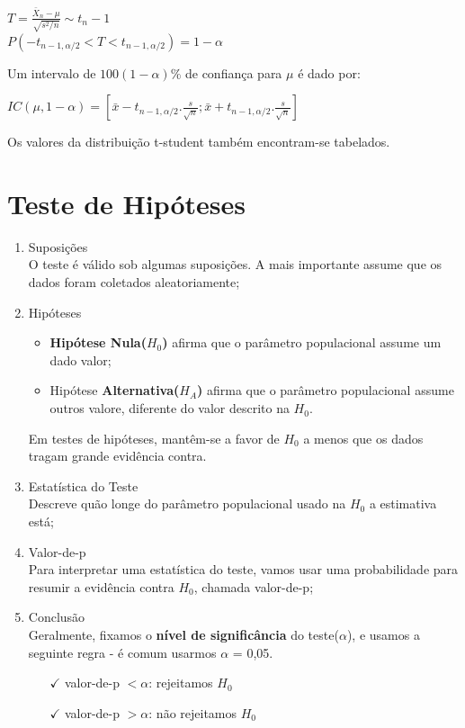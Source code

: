 \documentclass[a4paper, 12pt]{article}
\begin{document}
	\begin{center}
		\Large
		$ 
		T = \frac{\bar{X}_n - \mu}{\sqrt{s^2/n}} \sim t_n-1
		$\\
		$ 
		P(-t_{n-1, \alpha /2}< T < t_{n-1, \alpha /2}) = 1- \alpha
		$
	\end{center}
	Um intervalo de $ 100(1- \alpha) \%$ de confiança para $\mu$ é dado por:
	\begin{center}
		\Large
		$ 
		IC(\mu, 1- \alpha) = [\bar{x} - t_{n-1, \alpha /2}.\frac{s}{\sqrt{n}};\bar{x} + t_{n-1, \alpha /2}.\frac{s}{\sqrt{n}}]
		$
	\end{center}
	Os valores da distribuição t-student também encontram-se tabelados.

\section{Teste de Hipóteses}
	\begin{enumerate}
		\item Suposições\\
		O teste é válido sob algumas suposições. A mais importante assume que os dados foram coletados aleatoriamente;
		
		\item Hipóteses
			\begin{itemize}
				\item \textbf{Hipótese Nula($H_0$)} afirma que o parâmetro populacional assume um dado valor;
				\item Hipótese \textbf{Alternativa($H_A$)} afirma que o parâmetro populacional assume outros valore, diferente do valor descrito na $H_0$.
			\end{itemize}
		Em testes de hipóteses, mantêm-se a favor de $H_0$ a menos que os dados tragam grande evidência contra.
		
		\item Estatística do Teste\\
		Descreve quão longe do parâmetro populacional usado na $H_0$ a estimativa está;
		
		\item Valor-de-p\\
		Para interpretar uma estatística do teste, vamos usar uma probabilidade para resumir a evidência contra $H_0$, chamada valor-de-p;
		
		\item Conclusão\\
		Geralmente, fixamos o \textbf{nível de significância} do teste($\alpha$), e usamos a seguinte regra - é comum usarmos $\alpha$ = 0,05.
			\begin{itemize}
				\item[$\checkmark$] valor-de-p $< \alpha$: rejeitamos $H_0$
				\item[$\checkmark$] valor-de-p $> \alpha$: não rejeitamos $H_0$
			\end{itemize} 
	\end{enumerate}
\end{document}

